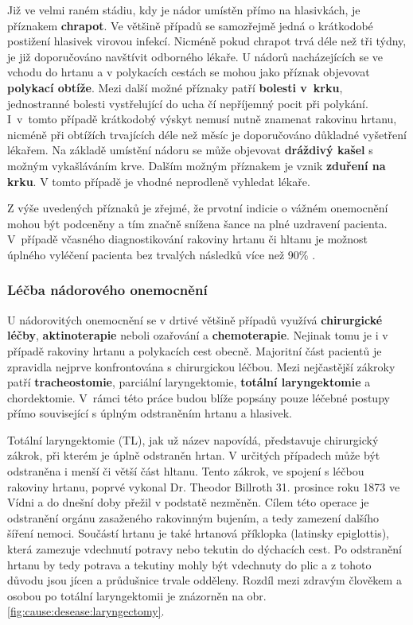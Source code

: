Již ve velmi raném stádiu, kdy je nádor umístěn přímo na hlasivkách, je
příznakem \textbf{chrapot}. Ve většině případů se samozřejmě jedná o
krátkodobé postižení hlasivek virovou infekcí. Nicméně pokud chrapot trvá déle
než tři týdny, je již doporučováno navštívit odborného lékaře.
U nádorů nacházejících se ve vchodu do hrtanu a v polykacích cestách se mohou
jako příznak objevovat \textbf{polykací obtíže}. Mezi další možné příznaky
patří \textbf{bolesti v~krku}, jednostranné bolesti vystřelující do ucha čí
nepříjemný pocit při polykání. I~v~tomto případě krátkodobý výskyt nemusí
nutně znamenat rakovinu hrtanu, nicméně při obtížích trvajících déle než měsíc
je doporučováno důkladné  vyšetření lékařem.
Na základě umístění nádoru se může objevovat \textbf{dráždivý kašel} s možným
vykašláváním krve. Dalším možným příznakem je vznik \textbf{zduření na krku}.
V tomto případě je vhodné neprodleně vyhledat lékaře.

Z výše uvedených příznaků je zřejmé, že prvotní indicie o vážném onemocnění
mohou být podceněny a tím značně snížena šance na plné uzdravení pacienta.
V~případě včasného diagnostikování rakoviny hrtanu či hltanu je možnost
úplného vyléčení pacienta bez trvalých následků více než 90\%
\cite{Slavicek2000}.


\subsubsection{Léčba nádorového onemocnění} %
\label{chap:cause:desease:cancer:treatment}

U nádorovitých onemocnění se v drtivé většině případů využívá
\textbf{chirurgické léčby}, \textbf{aktinoterapie} neboli ozařování a
\textbf{chemoterapie}. Nejinak tomu je i v případě rakoviny hrtanu a
polykacích cest obecně. Majoritní část pacientů je zpravidla nejprve
konfrontována s chirurgickou léčbou. Mezi nejčastější zákroky patří
\textbf{tracheostomie}, parciální laryngektomie, \textbf{totální
laryngektomie} a chordektomie. V~rámci této práce budou blíže popsány pouze
léčebné postupy přímo související s úplným odstraněním hrtanu a hlasivek.

Totální laryngektomie (TL), jak už název napovídá, představuje chirurgický
zákrok, při kterém je úplně odstraněn hrtan. V určitých případech může být
odstraněna i menší či větší část hltanu. Tento zákrok, ve spojení s léčbou
rakoviny hrtanu, poprvé vykonal Dr. Theodor Billroth 31. prosince roku 1873 ve
Vídni \cite{Gussenbauer1874} a do dnešní doby přežil v podstatě nezměněn.
Cílem této operace je odstranění orgánu zasaženého rakovinným bujením, a tedy
zamezení dalšího šíření nemoci. Součástí hrtanu je také hrtanová příklopka
(latinsky epiglottis), která zamezuje vdechnutí potravy nebo tekutin do
dýchacích cest. Po odstranění hrtanu by tedy potrava a tekutiny mohly být
vdechnuty do plic a z tohoto důvodu jsou jícen a průdušnice trvale odděleny.
Rozdíl mezi zdravým člověkem a osobou po totální laryngektomii je znázorněn na
obr. \ref{fig:cause:desease:laryngectomy}.

